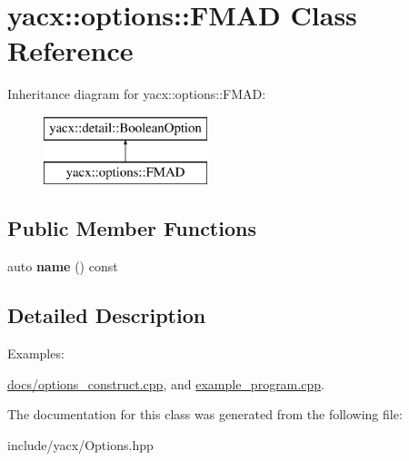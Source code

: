 \hypertarget{classyacx_1_1options_1_1_f_m_a_d}{}\section{yacx\+:\+:options\+:\+:F\+M\+AD Class Reference}
\label{classyacx_1_1options_1_1_f_m_a_d}
Inheritance diagram for yacx\+:\+:options\+:\+:F\+M\+AD\+:\begin{figure}[H]
\begin{center}
\leavevmode
\includegraphics[height=2.000000cm]{classyacx_1_1options_1_1_f_m_a_d}
\end{center}
\end{figure}
\subsection*{Public Member Functions}
\begin{DoxyCompactItemize}
\item 
\mbox{\label{classyacx_1_1options_1_1_f_m_a_d_a46c2300af4cd962af3585704094bcebb}} 
auto {\bfseries name} () const
\end{DoxyCompactItemize}


\subsection{Detailed Description}
\begin{Desc}
\item[Examples\+: ]\par
\hyperlink{docs_2options_construct_8cpp-example}{docs/options\+\_\+construct.\+cpp}, and \hyperlink{example_program_8cpp-example}{example\+\_\+program.\+cpp}.\end{Desc}


The documentation for this class was generated from the following file\+:\begin{DoxyCompactItemize}
\item 
include/yacx/Options.\+hpp\end{DoxyCompactItemize}
